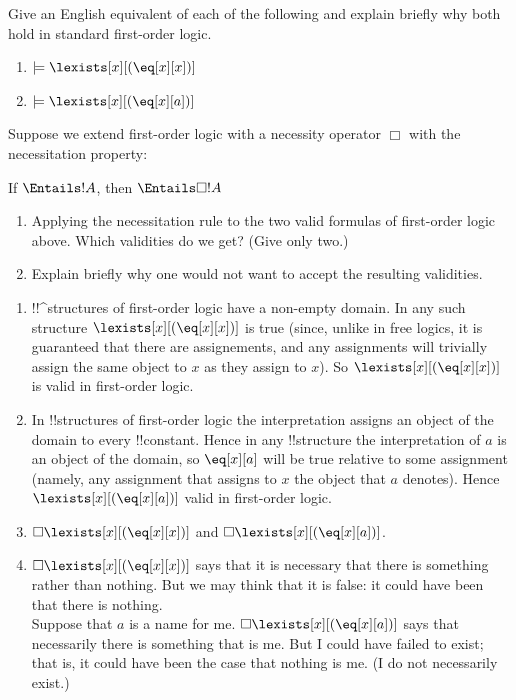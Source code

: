 \documentclass[../../../../include/open-logic-section]{subfiles}
\begin{document}


\begin{prob}
Give an English equivalent of each of the following and explain briefly why both
 hold in standard first-order logic.
\begin{enumerate}
\item $\models\lexists[x][(\eq[x][x])]$
\item $\models\lexists[x][(\eq[x][a])]$
\end{enumerate}

\noindent Suppose we extend first-order logic with a necessity operator $\Box$ with the  
necessitation property:
\begin{defn}
If $\Entails !A$, then $\Entails \Box !A$
\end{defn}

\begin{enumerate}
	\item[3.] Applying the necessitation rule to the two valid formulas of first-order logic above. Which validities do we get? (Give only two.) 
	\item[4.] Explain briefly why one would not want to accept the resulting validities.
\end{enumerate}

\begin{ans}
\begin{enumerate}
\item !!^{structure}s of first-order logic have a non-empty domain. In any
	such structure $\lexists[x][(\eq[x][x])]$ is true (since, unlike in
	free logics, it is guaranteed that there are assignements, and any assignments
	will trivially assign the same object to $x$ as they assign to $x$). So
	$\lexists[x][(\eq[x][x])]$ is valid in first-order logic. 
\item In !!{structure}s of first-order logic the interpretation assigns an
	object of the  domain to every !!{constant}. Hence in any !!{structure} the
	interpretation of $a$ is an object of the domain, so $\eq[x][a]$ will be true
	relative to some assignment (namely, any assignment that assigns to $x$ the
	object that $a$ denotes). Hence $\lexists[x][(\eq[x][a])]$ valid in first-order
	logic. 
\item $\Box\lexists[x][(\eq[x][x])]$ and $\Box\lexists[x][(\eq[x][a])]$.
\item $\Box\lexists[x][(\eq[x][x])]$ says that it is necessary that there is something 
	rather than nothing. But we may think that it is false: it could have been that there is 
	nothing. \\
	Suppose that $a$ is a name for me. $\Box\lexists[x][(\eq[x][a])]$ says that necessarily 
	there is something that is me. But I could have failed to exist; that is, it could have 
	been the case that nothing is me. (I do not necessarily exist.)
\end{enumerate}
\end{ans}
\end{prob}
\end{document}
